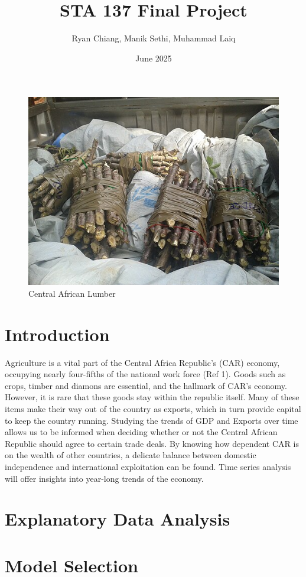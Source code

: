 \documentclass[11pt]{article}
\title{STA 137 Final Project}
\author{Ryan Chiang, Manik Sethi, Muhammad Laiq }
\date{June 2025}
\begin{document}
\maketitle


\begin{figure}[H]
    \centering
    \includegraphics[width=0.3\linewidth]{central_africa_republic.jpg}
    \caption{Central African Lumber}
    \label{fig:enter-label}
\end{figure}




\tableofcontents

\newcommand{\numberedpart}[1]{%
    \part{#1}%
}

\section{Introduction}

Agriculture is a vital part of the Central Africa Republic's (CAR) economy, occupying nearly four-fifths of the national work force (Ref 1). Goods such as crops, timber and diamons are essential, and the hallmark of CAR's economy. However, it is rare that these goods stay within the republic itself. Many of these items make their way out of the country as exports, which in turn provide capital to keep the country running.
Studying the trends of GDP and Exports over time allows us to be informed when deciding whether or not the Central African Republic should agree to certain trade deals. By knowing how dependent CAR is on the wealth of other countries, a delicate balance between domestic independence and international exploitation can be found. Time series analysis will offer insights into year-long trends of the economy.


\section{Explanatory Data Analysis}


\section{Model Selection}
\end{document}

